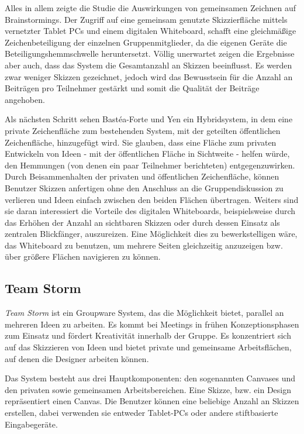\medskip Alles in allem zeigte die Studie die Auswirkungen von gemeinsamen Zeichnen auf Brainstormings. Der Zugriff auf eine gemeinsam genutzte Skizzierfläche mittels vernetzter Tablet PCs und einem digitalen Whiteboard, schafft eine gleichmäßige Zeichenbeteiligung der einzelnen Gruppenmitglieder, da die eigenen Geräte die Beteiligungshemmschwelle heruntersetzt. Völlig unerwartet zeigen die Ergebnisse aber auch, dass das System die Gesamtanzahl an Skizzen beeinflusst. Es werden zwar weniger Skizzen gezeichnet, jedoch wird das Bewusstsein für die Anzahl an Beiträgen pro Teilnehmer gestärkt und somit die Qualität der Beiträge angehoben.

\medskip Als nächsten Schritt sehen Bastéa-Forte und Yen ein Hybridsystem, in dem eine private Zeichenfläche zum bestehenden System, mit der geteilten öffentlichen Zeichenfläche, hinzugefügt wird. Sie glauben, dass eine Fläche zum privaten  Entwickeln von Ideen - mit der öffentlichen Fläche in Sichtweite - helfen würde, den Hemmungen (von denen ein paar Teilnehmer berichteten) entgegenzuwirken. Durch Beisammenhalten der privaten und öffentlichen Zeichenfläche, können Benutzer Skizzen anfertigen ohne den Anschluss an die Gruppendiskussion zu verlieren und Ideen einfach zwischen den beiden Flächen übertragen.
Weiters sind sie daran interessiert die Vorteile des digitalen Whiteboards, beispielsweise durch das Erhöhen der Anzahl an sichtbaren Skizzen oder durch dessen Einsatz als zentralen Blickfänger, auszureizen. Eine Möglichkeit dies zu bewerkstelligen wäre, das Whiteboard zu benutzen, um mehrere Seiten gleichzeitig anzuzeigen bzw. über größere Flächen navigieren zu können. \citep{Bastea-Forte:2007}

\subsection{Team Storm} 
\emph{Team Storm} \citep{Hailpern:2007p113} ist ein Groupware System, das die Möglichkeit bietet, parallel an mehreren Ideen zu arbeiten. Es kommt bei Meetings in frühen Konzeptionsphasen zum Einsatz und fördert Kreativität innerhalb der Gruppe. Es konzentriert sich auf das Skizzieren von Ideen und bietet private und gemeinsame Arbeitsflächen, auf denen die Designer arbeiten können.

Das System besteht aus drei Hauptkomponenten: den sogenannten Canvases und den privaten sowie gemeinsamen Arbeitsbereichen. Eine Skizze, bzw. ein Design repräsentiert einen Canvas. Die Benutzer können eine beliebige Anzahl an Skizzen erstellen, dabei verwenden sie entweder Tablet-PCs oder andere stiftbasierte Eingabegeräte. 

